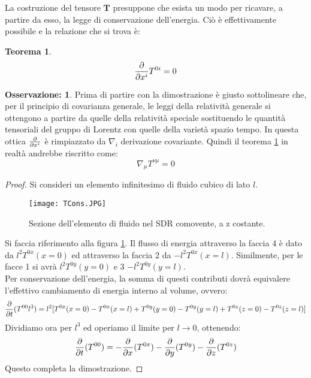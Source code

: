 \documentclass[]{report}
\theoremstyle{definition}
\theoremstyle{Theorem}
\newtheorem{Theo}[Def]{Teorema}
\theoremstyle{definition}
\theoremstyle{definition}
\theoremstyle{definition}
\newtheorem{Obs}[Def]{Osservazione:}
\begin{document}
La costruzione del tensore $\textbf{T}$ presuppone che esista un modo per ricavare, a partire da esso, la legge di conservazione dell'energia. Ciò è effettivamente possibile e la relazione che si trova è:
\begin{Theo} \label{Teo 2}
	$${\partial \over \partial x^i}T^{0i}=0$$	
\end{Theo}
\begin{Obs}
Prima di partire con la dimostrazione è giusto sottolineare che, per il principio di covarianza generale, le leggi della relatività generale si ottengono a partire da quelle della relatività speciale sostituendo le quantità tensoriali del gruppo di Lorentz con quelle della varietà spazio tempo. In questa ottica ${\partial \over \partial x^i}$ è rimpiazzato da $\nabla_i$ derivazione covariante. Quindi il teorema \ref{Teo 2} in realtà andrebbe riscritto come:
$$\nabla_\mu T^{\nu\mu}=0$$
\end{Obs}
\begin{proof}
	Si consideri un elemento infinitesimo di fluido cubico di lato $l$.
	\begin{figure} [H]
		\centering
		\label{Image 2}
		\texttt{[image: TCons.JPG]}
		\caption{Sezione dell'elemento di fluido nel SDR comovente, a z costante.}	
	\end{figure}
Si faccia riferimento alla figura \ref{Image 2}. Il flusso di energia attraverso la faccia 4 è dato da $l^2T^{0x}(x=0)$ ed attraverso la faccia 2 da $-l^2T^{0x}(x=l)$. Similmente, per le facce 1 si avrà $l^2T^{0y}(y=0)$ e 3 $-l^2T^{0y}(y=l)$.\\
Per conservazione dell'energia, la somma di questi contributi dovrà equivalere l'effettivo cambiamento di energia interno al volume, ovvero:
$${\partial \over \partial t}(T^{00}l^3)=l^2[T^{0x}(x=0)-T^{0x}(x=l)+T^{0y}(y=0)-T^{0y}(y=l)+T^{0z}(z=0)-T^{0z}(z=l)]$$
Dividiamo ora per $l^3$ ed operiamo il limite per $l\rightarrow 0$, ottenendo:
$${\partial \over \partial t}(T^{00})=-{\partial \over \partial x}(T^{0x})-{\partial \over \partial y}(T^{0y})-{\partial \over \partial z}(T^{0z})$$
Questo completa la dimostrazione.
\end{proof}
\end{document}
